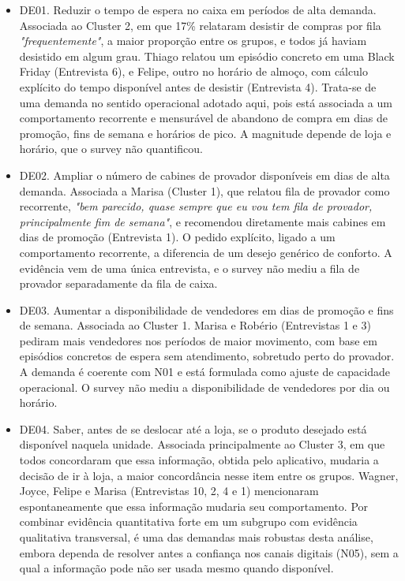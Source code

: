 \begin{itemize}
    \item DE01. Reduzir o tempo de espera no caixa em períodos de alta demanda. Associada ao Cluster 2, em que 17\% relataram desistir de compras por fila \emph{"frequentemente"}, a maior proporção entre os grupos, e todos já haviam desistido em algum grau. Thiago relatou um episódio concreto em uma Black Friday (Entrevista 6), e Felipe, outro no horário de almoço, com cálculo explícito do tempo disponível antes de desistir (Entrevista 4). Trata-se de uma demanda no sentido operacional adotado aqui, pois está associada a um comportamento recorrente e mensurável de abandono de compra em dias de promoção, fins de semana e horários de pico. A magnitude depende de loja e horário, que o survey não quantificou.

    \item DE02. Ampliar o número de cabines de provador disponíveis em dias de alta demanda. Associada a Marisa (Cluster 1), que relatou fila de provador como recorrente, \emph{"bem parecido, quase sempre que eu vou tem fila de provador, principalmente fim de semana"}, e recomendou diretamente mais cabines em dias de promoção (Entrevista 1). O pedido explícito, ligado a um comportamento recorrente, a diferencia de um desejo genérico de conforto. A evidência vem de uma única entrevista, e o survey não mediu a fila de provador separadamente da fila de caixa.

    \item DE03. Aumentar a disponibilidade de vendedores em dias de promoção e fins de semana. Associada ao Cluster 1. Marisa e Robério (Entrevistas 1 e 3) pediram mais vendedores nos períodos de maior movimento, com base em episódios concretos de espera sem atendimento, sobretudo perto do provador. A demanda é coerente com N01 e está formulada como ajuste de capacidade operacional. O survey não mediu a disponibilidade de vendedores por dia ou horário.

    \item DE04. Saber, antes de se deslocar até a loja, se o produto desejado está disponível naquela unidade. Associada principalmente ao Cluster 3, em que todos concordaram que essa informação, obtida pelo aplicativo, mudaria a decisão de ir à loja, a maior concordância nesse item entre os grupos. Wagner, Joyce, Felipe e Marisa (Entrevistas 10, 2, 4 e 1) mencionaram espontaneamente que essa informação mudaria seu comportamento. Por combinar evidência quantitativa forte em um subgrupo com evidência qualitativa transversal, é uma das demandas mais robustas desta análise, embora dependa de resolver antes a confiança nos canais digitais (N05), sem a qual a informação pode não ser usada mesmo quando disponível.


\end{itemize}
